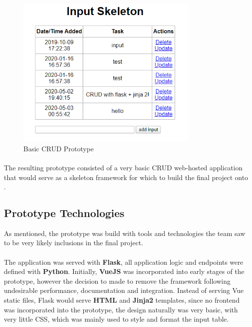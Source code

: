 \begin{figure}[H]
	\caption{Basic CRUD Prototype}
	\label{image:prototype}
	\centering
	\includegraphics[width=0.8\textwidth]{images/prototype.png}
\end{figure}	

\paragraph{}
The resulting prototype consisted of a very basic CRUD web-hosted application that would serve as a skeleton framework for which to build the final project onto \cite{PROTOTYPE}.

\subsection{Prototype Technologies}
As mentioned, the prototype was build with tools and technologies the team saw to be very likely inclusions in the final project. 

\paragraph{}
The application was served with \textbf{Flask}, all application logic and endpoints were defined with \textbf{Python}. Initially, \textbf{VueJS} was incorporated into early stages of the prototype, however the decision to made to remove the framework following undesirable performance, documentation and integration. Instead of serving Vue static files, Flask would serve \textbf{HTML} and \textbf{Jinja2} templates, since no frontend was incorporated into the prototype, the design naturally was very basic, with very little CSS, which was mainly used to style and format the input table.

